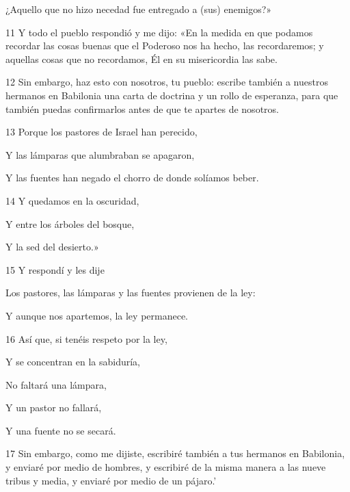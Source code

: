 \par ¿Aquello que no hizo necedad fue entregado a (sus) enemigos?»

\par 11 Y todo el pueblo respondió y me dijo: «En la medida en que podamos recordar las cosas buenas que el Poderoso nos ha hecho, las recordaremos; y aquellas cosas que no recordamos, Él en su misericordia las sabe.

\par 12 Sin embargo, haz esto con nosotros, tu pueblo: escribe también a nuestros hermanos en Babilonia una carta de doctrina y un rollo de esperanza, para que también puedas confirmarlos antes de que te apartes de nosotros.

\par 13 Porque los pastores de Israel han perecido,

\par Y las lámparas que alumbraban se apagaron,

\par Y las fuentes han negado el chorro de donde solíamos beber.

\par 14 Y quedamos en la oscuridad,

\par Y entre los árboles del bosque,

\par Y la sed del desierto.»

\par 15 Y respondí y les dije

\par Los pastores, las lámparas y las fuentes provienen de la ley:

\par Y aunque nos apartemos, la ley permanece.

\par 16 Así que, si tenéis respeto por la ley,

\par Y se concentran en la sabiduría,

\par No faltará una lámpara,

\par Y un pastor no fallará,

\par Y una fuente no se secará.

\par 17 Sin embargo, como me dijiste, escribiré también a tus hermanos en Babilonia, y enviaré por medio de hombres, y escribiré de la misma manera a las nueve tribus y media, y enviaré por medio de un pájaro.'

